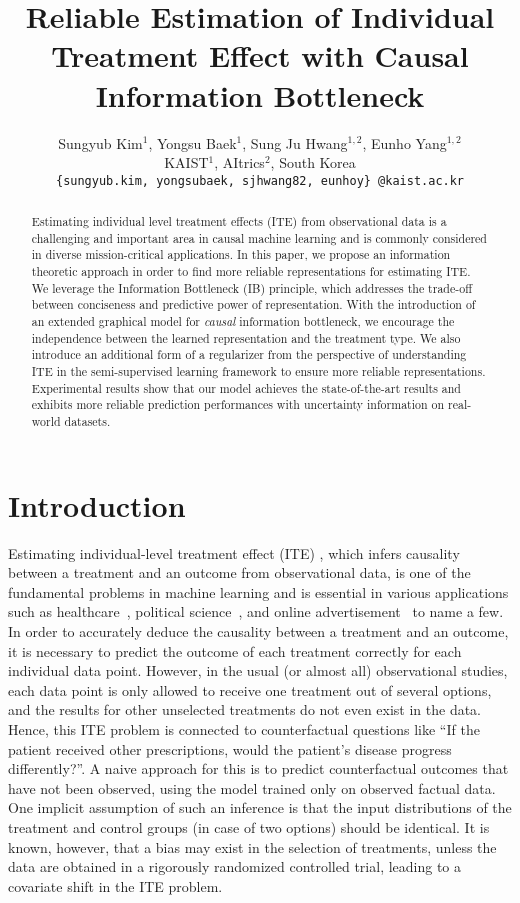 \documentclass{article}
\title{Reliable Estimation of Individual Treatment Effect with Causal Information Bottleneck}
\author{Sungyub Kim$^{1}$, Yongsu Baek$^{1}$, Sung Ju Hwang$^{1,2}$, Eunho Yang$^{1,2}$\\
   KAIST$^{1}$, AItrics$^{2}$, South Korea\\
   \texttt{\{sungyub.kim, yongsubaek, sjhwang82, eunhoy\} @kaist.ac.kr} \\
}
\begin{document}
\maketitle

\begin{abstract}
  Estimating individual level treatment effects (ITE) from observational data is a challenging and important area in causal machine learning and is commonly considered in diverse mission-critical applications. In this paper, we propose an information theoretic approach in order to find more reliable representations for estimating ITE. We leverage the Information Bottleneck (IB) principle, which addresses the trade-off between conciseness and  predictive power of representation. With the introduction of an extended graphical model for \emph{causal} information bottleneck, we encourage the independence between the learned representation and the treatment type. 
  We also introduce an additional form of a regularizer from the perspective of understanding ITE in the semi-supervised learning framework to ensure more reliable representations. Experimental results show that our model achieves the state-of-the-art results and exhibits more reliable prediction performances with uncertainty information on real-world datasets.
  \end{abstract}

\section{Introduction}

Estimating individual-level treatment effect (ITE) , which infers causality between a treatment and an outcome from observational data, is one of the fundamental problems in machine learning and is essential in various applications such as healthcare~\cite{Shalit17,Glass13,Alaa17}, political science~\cite{Smith2005,LaLonde1986}, and online advertisement~\cite{Li16, Wang15} to name a few. In order to accurately deduce the causality between a treatment and an outcome, it is necessary to predict the outcome of each treatment correctly for each individual data point. However, in the usual (or almost all) observational studies, each data point is only allowed to receive one treatment out of several options, and the results for other unselected treatments do not even exist in the data. Hence, this ITE problem is connected to counterfactual questions \cite{johansson16} like ``If the patient received other prescriptions, would the patient's disease progress differently?''. A naive approach for this is to predict counterfactual outcomes that have not been observed, using the model trained only on observed factual data. One implicit assumption of such an inference is that the input distributions of the treatment and control groups (in case of two options) should be identical. It is known, however, that a bias may exist in the selection of treatments, unless the data are obtained in a rigorously randomized controlled trial, leading to a covariate shift in the ITE problem.
  
\end{document}
